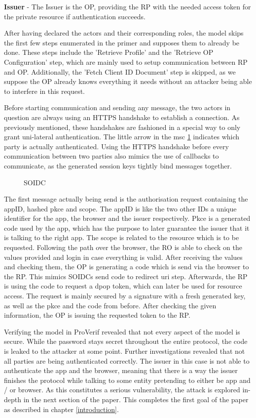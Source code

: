 \documentclass[11pt,twoside,a4paper,openright]{book}
\begin{document}
\textbf{Issuer} - The Issuer is the OP, providing the RP with the needed access token for the private resource if authentication succeeds.

After having declared the actors and their corresponding roles, the model skips the first few steps enumerated in the primer and supposes them to already be done. These steps include the 'Retrieve Profile' and the 'Retrieve OP Configuration' step, which are mainly used to setup communication between RP and OP. Additionally, the 'Fetch Client ID Document' step is skipped, as we suppose the OP already knows everything it needs without an attacker being able to interfere in this request.

Before starting communication and sending any message, the two actors in question are always using an HTTPS handshake to establish a connection. As previously mentioned, these handshakes are fashioned in a special way to only grant uni-lateral authentication. The little arrow in the msc \ref{fig:msc_soidc} indicates which party is actually authenticated. Using the HTTPS handshake before every communication between two parties also mimics the use of callbacks to communicate, as the generated session keys tightly bind messages together.

\begin{figure}[H]
    \centering
    
    \caption{SOIDC}
    \label{fig:msc_soidc}
\end{figure}

The first message actually being send is the authorisation request containing the appID, hashed pkce and scope. The appID is like the two other IDs a unique identifier for the app, the browser and the issuer respectively. Pkce is a generated code used by the app, which has the purpose to later guarantee the issuer that it is talking to the right app. The scope is related to the resource which is to be requested. Following the path over the browser, the RO is able to check on the values provided and login in case everything is valid. After receiving the values and checking them, the OP is generating a code which is send via the browser to the RP. This mimics SOIDCs send code to redirect uri step. Afterwards, the RP is using the code to request a dpop token, which can later be used for resource access. The request is mainly secured by a signature with a fresh generated key, as well as the pkce and the code from before. After checking the given information, the OP is issuing the requested token to the RP.

Verifying the model in ProVerif revealed that not every aspect of the model is secure. While the password stays secret throughout the entire protocol, the code is leaked to the attacker at some point. Further investigations revealed that not all parties are being authenticated correctly. The issuer in this case is not able to authenticate the app and the browser, meaning that there is a way the issuer finishes the protocol while talking to some entity pretending to either be app and / or browser. As this constitutes a serious vulnerability, the attack is explored in-depth in the next section of the paper. This completes the first goal of the paper as described in chapter \ref{introduction}.
\end{document}

